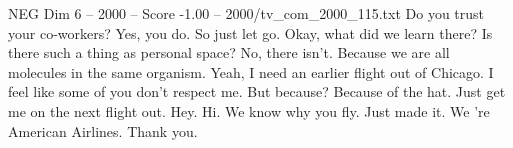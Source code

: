 \begin{textsample}{NEG Dim 6 – 2000 – Score -1.00 – 2000/tv\_com\_2000\_115.txt}  \label{ex:f6_neg_014}
Do you trust your co-workers?
Yes, you do.
So just let go.
Okay, what did we learn there?
Is there such a thing as personal space?
No, there isn't.
Because we are all molecules in the same organism.
Yeah, I need an earlier flight out of Chicago.
I feel like some of you don't respect me.
But because?
Because of the hat.
Just get me on the next flight out.
Hey.
Hi.
We know why you fly.
Just made it.
We 're American Airlines.
Thank you.

\end{textsample}
